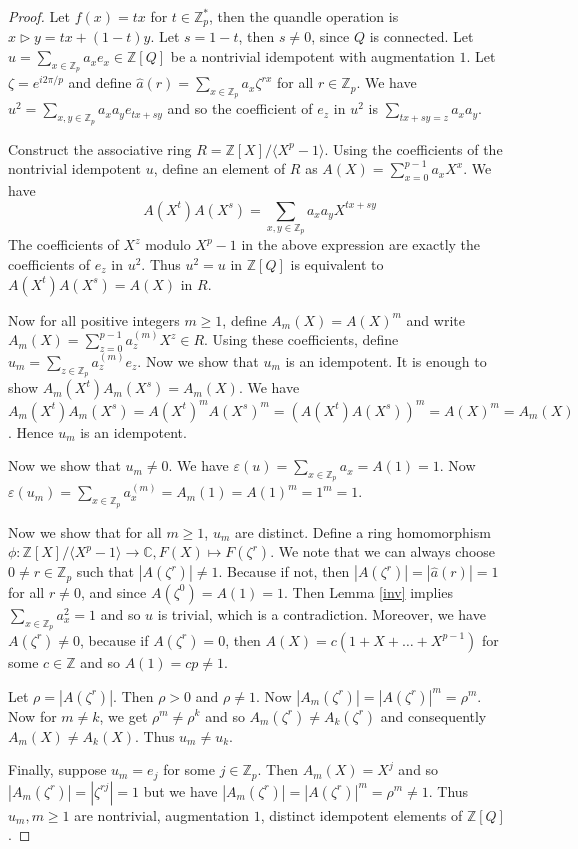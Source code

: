 \documentclass[10pt,twoside,reqno]{amsart}
\theoremstyle{definition}
\numberwithin{equation}{section}
\begin{document}
\begin{proof}
Let $f(x)=tx$ for $t\in \mathbb Z_{p}^{*}$, then the quandle operation is $x\triangleright y=tx+(1-t)y$. Let $s=1-t$, then $s\neq 0$, since $Q$ is connected.  Let $u = \sum\limits_{x\in \mathbb Z_p}a_xe_x\in \mathbb Z[Q]$ be a nontrivial idempotent with augmentation $1$. Let $\zeta=e^{i2\pi/p}$ and define $\hat{a}(r)=\sum\limits_{x\in \mathbb Z_p}a_x\zeta^{rx}$ for all $r\in \mathbb Z_{p}$. We have $u^2=\sum\limits_{x,y\in \mathbb Z_p}a_xa_ye_{tx+sy}$ and so the coefficient of $e_z$ in $u^2$ is $\sum\limits_{tx+sy=z}a_xa_y$.



Construct the associative ring $R=\mathbb Z[X]/\langle X^{p}-1 \rangle$. Using the coefficients of the nontrivial idempotent $u$, define an element of $R$ as $A(X)=\sum\limits_{x=0}^{p-1}a_xX^x$. We have 
\[ A(X^{t})A(X^{s})= \sum\limits_{x,y\in \mathbb Z_p}a_xa_yX^{tx+sy}\]
The coefficients of $X^z$ modulo $X^{p}-1$ in the above expression
are exactly the coefficients of $e_z$ in $u^2$. Thus $u^2=u$ in $\mathbb Z[Q]$ is equivalent to $A(X^{t})A(X^{s})=A(X)$ in $R$.

Now for all positive integers $m\geq 1$, define $A_m(X)=A(X)^m$ and write $A_m(X)=\sum\limits_{z=0}^{p-1}a_z^{(m)}X^z \in R$. Using these coefficients, define $u_m=\sum\limits_{z \in \mathbb Z_p}a_z^{(m)}e_z$. Now we show that $u_m$ is an idempotent. It is enough to show $A_m(X^{t})A_{m}(X^{s})=A_m(X)$. We have
$A_m(X^{t})A_m(X^{s})=A(X^{t})^mA(X^{s})^m=(A(X^{t})A(X^{s}))^m=A(X)^m=A_m(X)$. Hence $u_m$ is an idempotent.

Now we show that $u_m\neq 0$. We have $\varepsilon(u)=\sum\limits_{x\in \mathbb Z_p}a_x=A(1)=1$. Now $\varepsilon(u_m)=\sum\limits_{x\in \mathbb Z_p}a_x^{(m)}=A_m(1)=A(1)^m=1^m=1$.

Now we show that for all $m\geq 1$, $u_m$ are distinct. Define a ring homomorphism $\phi: \mathbb Z[X]/\langle X^{p}-1 \rangle \rightarrow \mathbb C, F(X)\mapsto F(\zeta^r)$. We note that we can always choose $0\neq r\in \mathbb Z_{p}$ such that $|A(\zeta^r)|\neq 1$. Because if not, then $|A(\zeta^r)|=|\hat{a}(r)|=1$ for all $r\neq 0$, and since $A(\zeta^0)=A(1)=1$. Then Lemma \ref{inv} implies $\sum\limits_{x\in \mathbb Z_p}a_x^2=1$ and so $u$ is trivial, which is a contradiction. 
Moreover, we have $A(\zeta^r)\neq 0$, because if $A(\zeta^r)=0$, then $A(X)=c(1+X+\dots+X^{p-1})$ for some $c\in \mathbb Z$ and so $A(1)=cp\neq 1$.


Let $\rho=|A(\zeta^r)|$. Then $\rho>0$ and $\rho\neq 1$. Now $|A_m(\zeta^r)|=|A(\zeta^r)|^m=\rho^m$. Now for $m\neq k$, we get $\rho^m\neq \rho^k$ and so $A_m(\zeta^r)\neq A_k(\zeta^r)$ and consequently $A_m(X)\neq A_k(X)$. Thus $u_m\neq u_k$.


Finally, suppose $u_m=e_j$ for some $j\in \mathbb Z_p$. Then $A_m(X)=X^j$ and so $|A_m(\zeta^r)|=|\zeta^{rj}|=1$ but we have $|A_m(\zeta^r)|=|A(\zeta^r)|^m=\rho^m\neq 1$. Thus $u_m,m\geq 1$ are nontrivial, augmentation $1$, distinct idempotent elements of $\mathbb Z[Q]$.



\end{proof}
\end{document}
